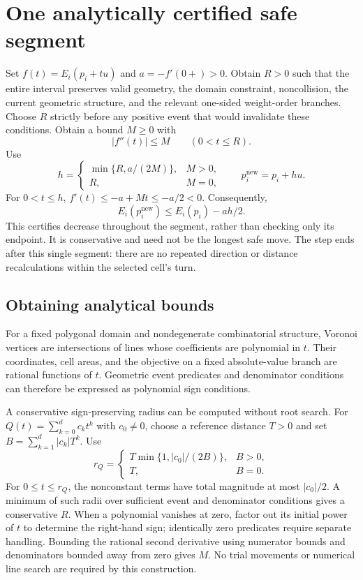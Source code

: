 \documentclass[11pt]{article}
\begin{document}
\section{One analytically certified safe segment}
Set $f(t)=E_i(p_i+tu)$ and $a=-f'(0+)>0$. Obtain $R>0$ such that the
entire interval preserves valid geometry, the domain constraint,
noncollision, the current geometric structure, and the relevant
one-sided weight-order branches. Choose $R$ strictly before any positive
event that would invalidate these conditions. Obtain a bound $M\ge0$ with
\[
 |f''(t)|\le M\qquad(0<t\le R).
\]
Use
\[
 h=\begin{cases}\min\{R,a/(2M)\},&M>0,\\R,&M=0,\end{cases}
 \qquad p_i^{\mathrm{new}}=p_i+hu.
\]
For $0<t\le h$, $f'(t)\le-a+Mt\le-a/2<0$. Consequently,
\[
 E_i(p_i^{\mathrm{new}})\le E_i(p_i)-ah/2.
\]
This certifies decrease throughout the segment, rather than checking only
its endpoint. It is conservative and need not be the longest safe move.
The step ends after this single segment: there are no repeated direction
or distance recalculations within the selected cell's turn.

\subsection{Obtaining analytical bounds}
For a fixed polygonal domain and nondegenerate combinatorial structure,
Voronoi vertices are intersections of lines whose coefficients are
polynomial in $t$. Their coordinates, cell areas, and the objective on
a fixed absolute-value branch are rational functions of $t$.
Geometric event predicates and denominator conditions can therefore be
expressed as polynomial sign conditions.

A conservative sign-preserving radius can be computed without root
search. For $Q(t)=\sum_{k=0}^d c_k t^k$ with $c_0\ne0$, choose a
reference distance $T>0$ and set $B=\sum_{k=1}^d|c_k|T^k$. Use
\[
 r_Q=\begin{cases}
 T\min\{1,|c_0|/(2B)\},&B>0,\\T,&B=0.
 \end{cases}
\]
For $0\le t\le r_Q$, the nonconstant terms have total magnitude at most
$|c_0|/2$. A minimum of such radii over sufficient event and denominator
conditions gives a conservative $R$. When a polynomial vanishes at zero,
factor out its initial power of $t$ to determine the right-hand sign;
identically zero predicates require separate handling. Bounding the
rational second derivative using numerator bounds and denominators
bounded away from zero gives $M$. No trial movements or numerical
line search are required by this construction.
\end{document}
